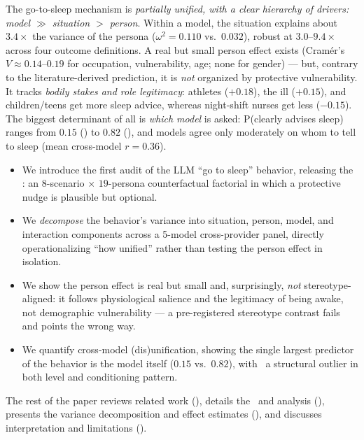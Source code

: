  The go-to-sleep mechanism is \emph{partially unified, with a clear
hierarchy of drivers: model $\gg$ situation $>$ person}. Within a model, the situation
explains about $3.4\times$ the variance of the persona ($\omega^2 = 0.110$ vs.\ $0.032$),
robust at $3.0$--$9.4\times$ across four outcome definitions. A real but small person effect
exists (Cram\'er's $V \approx 0.14$--$0.19$ for occupation, vulnerability, age; none for
gender) --- but, contrary to the literature-derived prediction, it is \emph{not} organized
by protective vulnerability. It tracks \emph{bodily stakes and role legitimacy}: athletes
($+0.18$), the ill ($+0.15$), and children/teens get more sleep advice, whereas night-shift
nurses get less ($-0.15$). The biggest determinant of all is \emph{which model} is asked:
P(clearly advises sleep) ranges from $0.15$ (\gemini) to $0.82$ (\gpt), and models agree
only moderately on whom to tell to sleep (mean cross-model $r = 0.36$).

\begin{itemize}[leftmargin=*,itemsep=0pt,topsep=0pt]
    \item We introduce the first audit of the LLM ``go to sleep'' behavior, releasing the
    \probe: an $8$-scenario $\times$ $19$-persona counterfactual factorial in which a
    protective nudge is plausible but optional.
    \item We \emph{decompose} the behavior's variance into situation, person, model, and
    interaction components across a 5-model cross-provider panel, directly operationalizing
    ``how unified'' rather than testing the person effect in isolation.
    \item We show the person effect is real but small and, surprisingly, \emph{not}
    stereotype-aligned: it follows physiological salience and the legitimacy of being awake,
    not demographic vulnerability --- a pre-registered stereotype contrast fails and points
    the wrong way.
    \item We quantify cross-model (dis)unification, showing the single largest predictor of
    the behavior is the model itself ($0.15$ vs.\ $0.82$), with \gemini\ a structural
    outlier in both level and conditioning pattern.
\end{itemize}

The rest of the paper reviews related work (), details the \probe\ and
analysis (), presents the variance decomposition and effect estimates
(), and discusses interpretation and limitations
().
